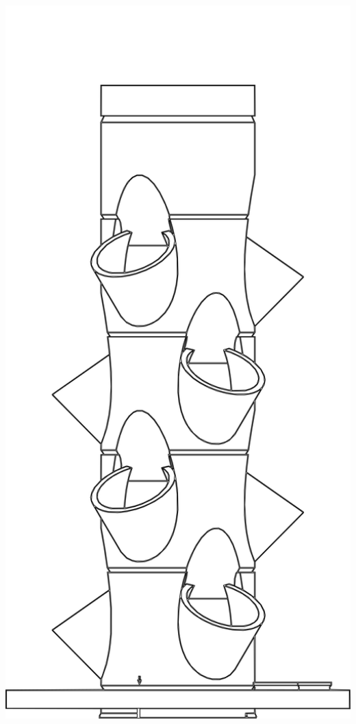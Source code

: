 \documentclass{tower-manual}
\begin{document}
\begin{titlepage}
\begin{center}
\begin{minipage}{0.45\textwidth}
        \end{minipage}
        \hfill
        \begin{minipage}{0.45\textwidth}
            \includegraphics[width=1.0\textwidth]{images/50mm_wireframe.png}
        \end{minipage}
    \end{center}
\end{titlepage}
\end{document}
